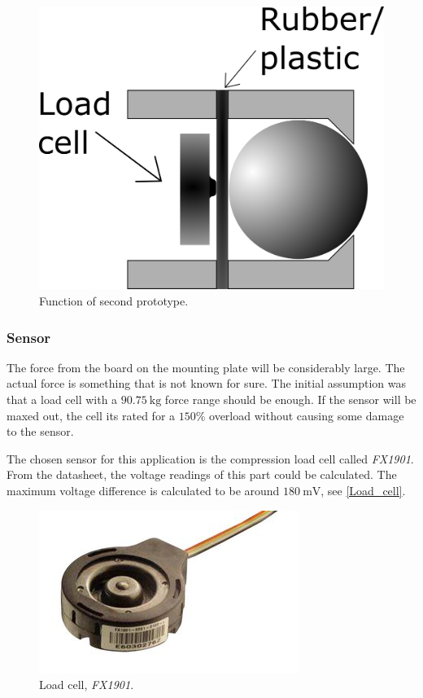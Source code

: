 \begin{figure}[H]
\begin{center}
	\includegraphics[width = .45\textwidth]{Figures/Press_sens_func_2.png}
	\caption{Function of second prototype.}
	\label{Press_sens_prot_2}
\end{center}
\end{figure}



\subsubsection{Sensor}
The force from the board on the mounting plate will be considerably large. The actual force is something that is not known for sure. The initial assumption was that a load cell with a $90.75~\textrm{kg}$ force range should be enough. If the sensor will be maxed out, the cell its rated for a $150\%$ overload without causing some damage to the sensor. 

The chosen sensor for this application is the compression load cell called \emph{FX1901}. 
From the datasheet\cite{load_cell}, the voltage readings of this part could be calculated. The maximum voltage difference is calculated to be around $180~\textrm{mV}$, see \autoref{Load_cell}.
\begin{figure}[H]
\begin{center}
	\includegraphics[width = .45\textwidth]{Figures/Load_cell.png}
	\caption{Load cell, \emph{FX1901}.}
	\label{Load_cell}
\end{center}
\end{figure}


